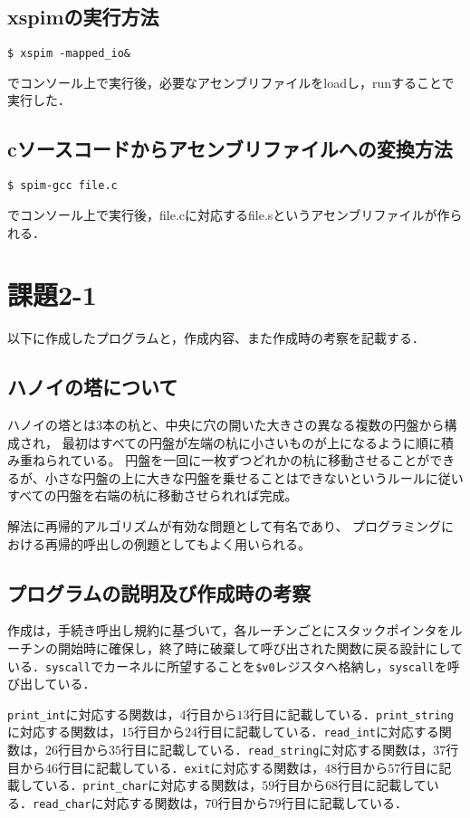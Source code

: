 \documentclass[a4j,11pt]{jarticle}
\begin{document}
\subsection{xspimの実行方法}
\begin{verbatim}
$ xspim -mapped_io&
\end{verbatim}
でコンソール上で実行後，必要なアセンブリファイルをloadし，runすることで実行した．

\subsection{cソースコードからアセンブリファイルへの変換方法} 
\begin{verbatim}
$ spim-gcc file.c
\end{verbatim}
でコンソール上で実行後，file.cに対応するfile.sというアセンブリファイルが作られる．
 \section{課題2-1}
以下に作成したプログラムと，作成内容、また作成時の考察を記載する．

 
\subsection{ハノイの塔について}
ハノイの塔とは3本の杭と、中央に穴の開いた大きさの異なる複数の円盤から構成され，
最初はすべての円盤が左端の杭に小さいものが上になるように順に積み重ねられている。
円盤を一回に一枚ずつどれかの杭に移動させることができるが、小さな円盤の上に大きな円盤を乗せることはできないというルールに従い
すべての円盤を右端の杭に移動させられれば完成。

解法に再帰的アルゴリズムが有効な問題として有名であり、
プログラミングにおける再帰的呼出しの例題としてもよく用いられる。
  \subsection{プログラムの説明及び作成時の考察}
作成は，手続き呼出し規約に基づいて，各ルーチンごとにスタックポインタをルーチンの開始時に確保し，終了時に破棄して呼び出された関数に戻る設計にしている．\verb|syscall|でカーネルに所望することを\verb|$v0|レジスタへ格納し，\verb|syscall|を呼び出している．

\verb|print_int|に対応する関数は，$4$行目から$13$行目に記載している．\verb|print_string|に対応する関数は，$15$行目から$24$行目に記載している．\verb|read_int|に対応する関数は，$26$行目から$35$行目に記載している．\verb|read_string|に対応する関数は，$37$行目から$46$行目に記載している．\verb|exit|に対応する関数は，$48$行目から$57$行目に記載している．\verb|print_char|に対応する関数は，$59$行目から$68$行目に記載している．\verb|read_char|に対応する関数は，$70$行目から$79$行目に記載している．
\end{document}
